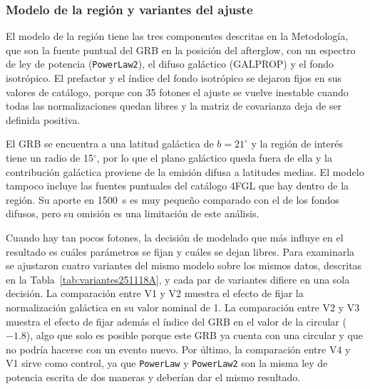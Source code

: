 \subsubsection{Modelo de la región y variantes del ajuste}

El modelo de la región tiene las tres componentes descritas en la Metodología, que son la fuente puntual
del GRB en la posición del afterglow, con un espectro de ley de potencia (\texttt{PowerLaw2}), el difuso
galáctico (GALPROP) y el fondo isotrópico. El prefactor y el índice del fondo isotrópico se dejaron fijos
en sus valores de catálogo, porque con 35 fotones el ajuste se vuelve inestable cuando todas las
normalizaciones quedan libres y la matriz de covarianza deja de ser definida positiva.

El GRB se encuentra a una latitud galáctica de $b = 21^{\circ}$ y la región de interés tiene un radio de
15$^{\circ}$, por lo que el plano galáctico queda fuera de ella y la contribución galáctica proviene de
la emisión difusa a latitudes medias. El modelo tampoco incluye las fuentes puntuales del catálogo 4FGL
que hay dentro de la región. Su aporte en 1500~s es muy pequeño comparado con el de los fondos difusos,
pero su omisión es una limitación de este análisis.

Cuando hay tan pocos fotones, la decisión de modelado que más influye en el resultado es cuáles
parámetros se fijan y cuáles se dejan libres. Para examinarla se ajustaron cuatro variantes del mismo
modelo sobre los mismos datos, descritas en la Tabla~\ref{tab:variantes251118A}, y cada par de variantes
difiere en una sola decisión. La comparación entre V1 y V2 muestra el efecto de fijar la normalización
galáctica en su valor nominal de 1. La comparación entre V2 y V3 muestra el efecto de fijar además el
índice del GRB en el valor de la circular ($-1.8$), algo que solo es posible porque este GRB ya cuenta con
una circular y que no podría hacerse con un evento nuevo. Por último, la comparación entre V4 y V1 sirve
como control, ya que \texttt{PowerLaw} y \texttt{PowerLaw2} son la misma ley de potencia escrita de dos
maneras y deberían dar el mismo resultado.

